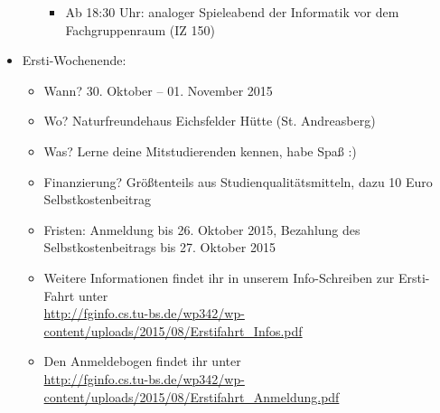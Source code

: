 \begin{itemize}
\begin{itemize}
\begin{itemize}
\item Ab 18:30 Uhr: analoger Spieleabend der Informatik vor dem Fachgruppenraum (IZ 150)
\end{itemize}
\end{itemize}
\item Ersti-Wochenende:
\begin{itemize}
\item Wann? 30. Oktober – 01. November 2015
\item Wo? Naturfreundehaus Eichsfelder Hütte (St. Andreasberg)
\item Was? Lerne deine Mitstudierenden kennen, habe Spaß :)
\item Finanzierung? Größtenteils aus Studienqualitätsmitteln, dazu 10 Euro Selbstkostenbeitrag
\item Fristen: Anmeldung bis 26. Oktober 2015, Bezahlung des Selbstkostenbeitrags bis 27. Oktober 2015
\item Weitere Informationen findet ihr in unserem Info-Schreiben zur Ersti-Fahrt unter\\ \url{http://fginfo.cs.tu-bs.de/wp342/wp-content/uploads/2015/08/Erstifahrt_Infos.pdf}
\item Den Anmeldebogen findet ihr unter\\ \url{http://fginfo.cs.tu-bs.de/wp342/wp-content/uploads/2015/08/Erstifahrt_Anmeldung.pdf}
\end{itemize}
\end{itemize}